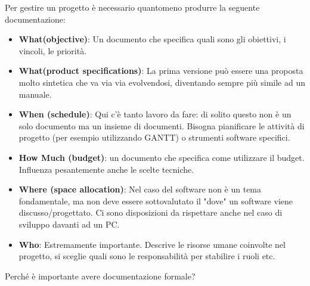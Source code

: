 Per gestire un progetto è necessario quantomeno produrre la seguente documentazione:
\begin{itemize}
	\item \textbf{What(objective)}: Un documento che specifica quali sono gli obiettivi, i vincoli, le priorità.
	\item \textbf{What(product specifications)}: La prima versione può essere una proposta molto sintetica che va via via evolvendosi, diventando sempre più simile ad un manuale.
	\item \textbf{When (schedule)}: Qui c'è tanto lavoro da fare: di solito questo non è un solo documento ma un insieme di documenti. Bisogna pianificare le attività di progetto (per esempio utilizzando GANTT) o strumenti software specifici.
	\item \textbf{How Much (budget)}: un documento che specifica come utilizzare il budget. Influenza pesantemente anche le scelte tecniche.
	\item \textbf{Where (space allocation)}: Nel caso del software non è un tema fondamentale, ma non deve essere sottovalutato il "dove" un software viene discusso/progettato. Ci sono disposizioni da rispettare anche nel caso di sviluppo davanti ad un PC.
	\item \textbf{Who}: Estremamente importante. Descrive le risorse umane coinvolte nel progetto, si sceglie quali sono le responsabilità per stabilire i ruoli etc.
\end{itemize}
Perché è importante avere documentazione formale?
